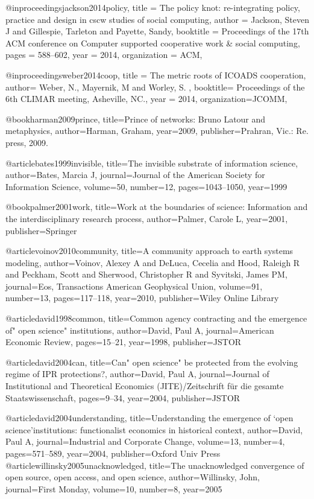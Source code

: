 @inproceedings{jackson2014policy,
  title = {{The policy knot: re-integrating policy, practice and design in cscw studies of social computing}},
  author = {Jackson, Steven J and Gillespie, Tarleton and Payette, Sandy},
  booktitle = {Proceedings of the 17th ACM conference on Computer supported cooperative work \& social computing},
  pages = {588--602},
  year = {2014},
  organization = {ACM},
}


@inproceedings{weber2014coop,
title = {The metric roots of ICOADS cooperation}, 
author= {Weber, N., Mayernik, M and Worley, S. },
booktitle= {Proceedings of the 6th CLIMAR meeting, Asheville, NC.},
year = {2014},
organization={JCOMM},
} 

@book{harman2009prince,
  title={Prince of networks: Bruno Latour and metaphysics},
  author={Harman, Graham},
  year={2009},
  publisher={Prahran, Vic.: Re. press, 2009.}
}




@article{bates1999invisible,
  title={The invisible substrate of information science},
  author={Bates, Marcia J},
  journal={Journal of the American Society for Information Science},
  volume={50},
  number={12},
  pages={1043--1050},
  year={1999}
}

@book{palmer2001work,
  title={Work at the boundaries of science: Information and the interdisciplinary research process},
  author={Palmer, Carole L},
  year={2001},
  publisher={Springer}
}

@article{voinov2010community,
  title={A community approach to earth systems modeling},
  author={Voinov, Alexey A and DeLuca, Cecelia and Hood, Raleigh R and Peckham, Scott and Sherwood, Christopher R and Syvitski, James PM},
  journal={Eos, Transactions American Geophysical Union},
  volume={91},
  number={13},
  pages={117--118},
  year={2010},
  publisher={Wiley Online Library}
}


@article{david1998common,
  title={Common agency contracting and the emergence of" open science" institutions},
  author={David, Paul A},
  journal={American Economic Review},
  pages={15--21},
  year={1998},
  publisher={JSTOR}
}

@article{david2004can,
  title={Can" open science" be protected from the evolving regime of IPR protections?},
  author={David, Paul A},
  journal={Journal of Institutional and Theoretical Economics (JITE)/Zeitschrift f{\"u}r die gesamte Staatswissenschaft},
  pages={9--34},
  year={2004},
  publisher={JSTOR}
}

@article{david2004understanding,
  title={Understanding the emergence of ‘open science’institutions: functionalist economics in historical context},
  author={David, Paul A},
  journal={Industrial and Corporate Change},
  volume={13},
  number={4},
  pages={571--589},
  year={2004},
  publisher={Oxford Univ Press}
}
@article{willinsky2005unacknowledged,
  title={The unacknowledged convergence of open source, open access, and open science},
  author={Willinsky, John},
  journal={First Monday},
  volume={10},
  number={8},
  year={2005}
}

